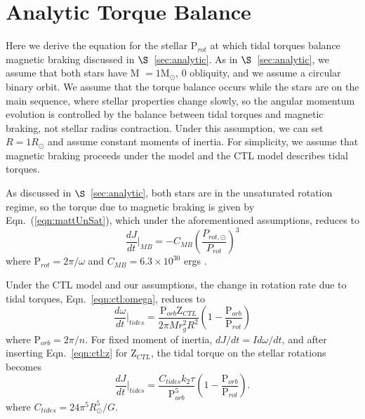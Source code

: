 \documentclass[twocolumn]{aastex61}
\begin{document}

\appendix

\section{Analytic Torque Balance} \label{sec:appendix:balance}

Here we derive the equation for the stellar P$_{rot}$ at which tidal torques balance magnetic braking discussed in $\S$~\ref{sec:analytic}. As in $\S$~\ref{sec:analytic}, we assume that both stars have M $= 1$M$_{\odot}$, 0 obliquity, and we assume a circular binary orbit. We assume that the torque balance occurs while the stars are on the main sequence, where stellar properties change slowly, so the angular momentum evolution is controlled by the balance between tidal torques and magnetic braking, not stellar radius contraction. Under this assumption, we can set $R = 1 R_{\odot}$ and assume constant moments of inertia. For simplicity, we assume that magnetic braking proceeds under the \citet{Matt2015} model and the CTL model describes tidal torques.

As discussed in $\S$~\ref{sec:analytic}, both stars are in the unsaturated rotation regime, so the torque due to magnetic braking is given by Eqn.~(\ref{eqn:mattUnSat}), which under the aforementioned assumptions, reduces to
\begin{equation}
    \frac{dJ}{dt}\Bigg|_{MB} = -C_{MB} \left( \frac{P_{rot,\odot}}{P_{rot}} \right)^3
\end{equation}
where P$_{rot} = 2 \pi / \omega$ and $C_{MB} = 6.3 \times 10^{30}$ ergs \citep{Matt2015,Matt2019}.

Under the CTL model and our assumptions, the change in rotation rate due to tidal torques, Eqn.~\ref{eqn:ctl:omega}, reduces to 
\begin{equation}
    \frac{d\omega}{dt}\Bigg|_{tides} = \frac{\mathrm{P}_{orb}\mathrm{Z}_{CTL}}{2 \pi M r_g^2 R^2}\left( 1 - \frac{\mathrm{P}_{orb}}{\mathrm{P}_{rot}} \right)
\end{equation}
where P$_{orb} = 2 \pi/n$.  For fixed moment of inertia, $dJ/dt =I d\omega/dt$, and after inserting Eqn.~\ref{eqn:ctl:z} for Z$_{CTL}$, the tidal torque on the stellar rotations becomes
\begin{equation}
    \frac{dJ}{dt}\Bigg|_{tides} = \frac{C_{tides} k_2 \tau}{\mathrm{P}_{orb}^5}\left( 1 - \frac{\mathrm{P}_{orb}}{\mathrm{P}_{rot}} \right).
\end{equation}
where $C_{tides} = 24 \pi^5 R_{\odot}^5 / G$. 
\end{document}
